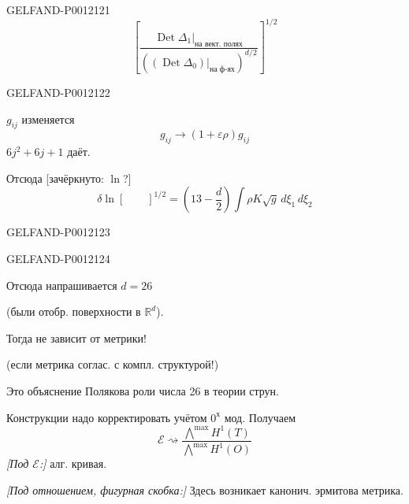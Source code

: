 \begin{GelfandAdjacentEvidence}{GELFAND-P001212}{1}
\[
\left[
\frac{\left.\operatorname{Det}\Delta_1\right|_{\text{на вект. полях}}}
{\left(\left.(\operatorname{Det}\Delta_0)\right|_{\text{на ф-ях}}\right)^{d/2}}
\right]^{1/2}
\]
\end{GelfandAdjacentEvidence}
\begin{GelfandAdjacentEvidence}{GELFAND-P001212}{2}


\(g_{ij}\) изменяется
\[
g_{ij}\longrightarrow(1+\varepsilon\rho)g_{ij}
\]
\(6j^2+6j+1\) даёт.

Отсюда [зачёркнуто: \(\ln\)?]
\[
\delta\ln[\qquad]^{1/2}=\left(13-\frac d2\right)
\int\rho K\sqrt g\,d\xi_1\,d\xi_2
\]
\end{GelfandAdjacentEvidence}
\begin{GelfandAdjacentEvidence}{GELFAND-P001212}{3}

\end{GelfandAdjacentEvidence}
\begin{GelfandAdjacentEvidence}{GELFAND-P001212}{4}


Отсюда напрашивается \(d=26\)

(были отобр. поверхности в \(\mathbb R^d\)).

Тогда не зависит от метрики!

(если метрика соглас. с компл. структурой!)

Это объяснение Полякова роли числа 26 в теории струн.

Конструкции надо корректировать учётом \(0^{\text{х}}\) мод. Получаем
\[
\mathcal E\rightsquigarrow
\frac{\bigwedge^{\max}H^1(T)}{\bigwedge^{\max}H^1(O)}
\]
\textit{[Под \(\mathcal E\):]} алг. кривая.

\textit{[Под отношением, фигурная скобка:]} Здесь возникает канонич. эрмитова метрика.
\end{GelfandAdjacentEvidence}



